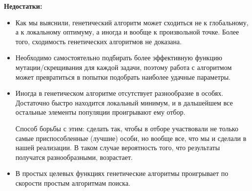 \documentclass[a4paper,11pt,russian]{article}
\begin{document}
\textbf{Недостатки:}
\begin{itemize}
\item Как мы выяснили, генетический алгоритм может сходиться не к глобальному, а к локальному оптимуму, а иногда и вообще к произвольной точке. Более того, сходимость генетических алгоритмов не доказана.
\item Необходимо самостоятельно подбирать более эффективную функцию мутации/скрещивания для каждой задачи, поэтому работа с алгоритмом может превратиться в попытки подобрать наиболее удачные параметры.
\item Иногда в генетическом алгоритме отсутствует разнообразие в особях. Достаточно быстро находится локальный минимум, и в дальшейшем все остальные элементы популяции проигрывают ему отбор. 

 Способ борьбы с этим: сделать так, чтобы в отборе участвовали не только самые приспособленные (лучшие) особи, но вообще все, что мы и сделали в нашей реализации. В таком случае вероятность того, что результаты получатся разнообразными, возрастает.
\item В простых целевых функциях генетические алгоритмы проигрывает по скорости простым алгоритмам поиска.
\end{itemize}
\end{document}
